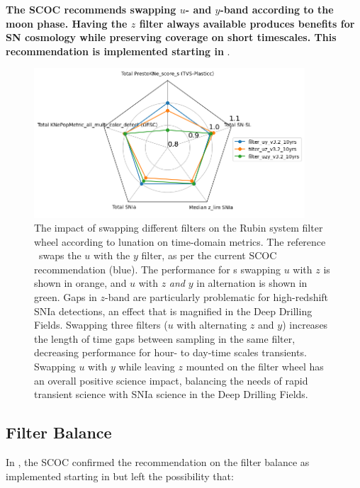 {\bf The SCOC recommends swapping $u$- and $y$-band according to the moon phase. Having the $z$ filter always available produces benefits for SN cosmology while preserving coverage on short timescales. This recommendation is implemented starting in }.

\begin{figure}
  \centering
\includegraphics[width=0.9\textwidth]{figures/filter_swap_KNe.png}
\caption{The impact of swapping different filters on the Rubin system filter wheel according to lunation on time-domain metrics. The reference \opsim\ swaps the $u$ with the $y$ filter, as per the current SCOC recommendation (blue). The performance for \opsim s swapping $u$ with $z$ is shown in orange, and $u$ with $z$ {\it and} $y$ in alternation is shown in green. Gaps in $z$-band are particularly problematic for high-redshift SNIa detections, an effect that is magnified in the Deep Drilling Fields.  
Swapping three filters ($u$ with alternating $z$ and $y$) increases the length of time gaps between sampling in the same filter, decreasing performance for hour- to day-time scales transients.
Swapping $u$ with $y$ while leaving $z$ mounted on the filter wheel has an overall positive science impact, balancing the needs of rapid transient science with SNIa science in the Deep Drilling Fields. }
\label{fig:swapping}
\end{figure}

\FloatBarrier
\subsection{Filter Balance}\label{sec:filterbalance}
 In , the SCOC confirmed the recommendation on the filter balance as implemented starting in  but left the possibility that:
  
